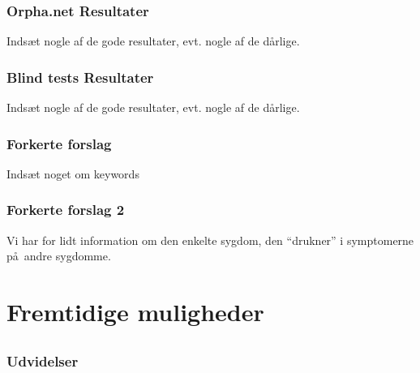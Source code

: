 \documentclass[xcolor=table]{beamer}
\begin{document}
\begin{frame}

  \frametitle{Orpha.net Resultater}

  Inds\ae t nogle af de gode resultater, evt. nogle af de d\aa rlige.

\end{frame}

\begin{frame}

  \frametitle{Blind tests Resultater}

  Inds\ae t nogle af de gode resultater, evt. nogle af de d\aa rlige.

\end{frame}

\begin{frame}

  \frametitle{Forkerte forslag}

  Inds\ae t noget om keywords

\end{frame}

\begin{frame}

  \frametitle{Forkerte forslag 2}

  Vi har for lidt information om den enkelte sygdom, den ``drukner'' i symptomerne p\aa\ andre sygdomme.

\end{frame}

\section{Fremtidige muligheder}

\subsection*{}

\begin{frame}

  \frametitle{Udvidelser}

\end{frame}





  

\end{document}
